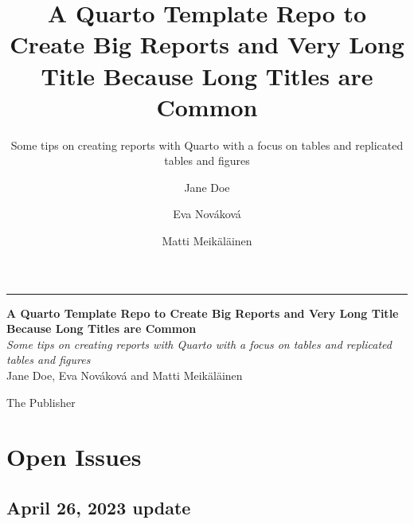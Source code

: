 \documentclass[
  letterpaper,
  oneside]{scrbook}
\title{A Quarto Template Repo to Create Big Reports and Very Long Title
Because Long Titles are Common}
\subtitle{Some tips on creating reports with Quarto with a focus on
tables and replicated tables and figures}
\author{Jane Doe \and Eva Nováková \and Matti Meikäläinen}
\date{}
\newcommand*{\plogo}{\fbox{$\mathcal{PL}$}} %
\renewcommand*\contentsname{Table of contents}
\newcommand\contentsname{Table of contents}
\begin{document}
\begin{frontmatter}

	\raggedleft %
	
	\rule{1pt}{\textheight} %
	\hspace{0.05\textwidth} %
	\parbox[b]{0.85\textwidth}{ %
	
		{\large\bfseries\nohyphens{A Quarto Template Repo to Create Big Reports
and Very Long Title Because Long Titles are
Common}}\\[2\baselineskip] %
				{\large\textit{Some tips on creating reports with Quarto with a focus on
tables and replicated tables and
figures}}\\[4\baselineskip] %
				
		        {\large{Jane Doe}}, 
        {\large{Eva Nováková}}        {and \large{Matti Meikäläinen}}
        		
		\vspace{0.5\textheight} %
		
		{\noindent The Publisher~~\plogo}\\[\baselineskip] %
	}

\end{frontmatter}\ifdefined\Shaded\renewenvironment{Shaded}{\begin{tcolorbox}[interior hidden, borderline west={3pt}{0pt}{shadecolor}, sharp corners, frame hidden, breakable, boxrule=0pt, enhanced]}{\end{tcolorbox}}\fi

\renewcommand*\contentsname{Table of contents}
{
\setcounter{tocdepth}{2}
\tableofcontents
}
\listoffigures
\listoftables
\mainmatter
{}

\hypertarget{open-issues}{%
\chapter{Open Issues}\label{open-issues}}

\hypertarget{april-26-2023-update}{%
\section{April 26, 2023 update}\label{april-26-2023-update}}
\end{document}
